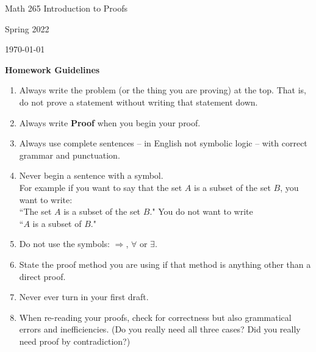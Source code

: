\documentclass[11pt]{report}
\theoremstyle{plain}
\begin{document}
\hfill Math 265 Introduction to Proofs

\hfill Spring 2022

\hfill \today

\begin{center}
\large{\textbf{Homework Guidelines}} \\
\end{center}
\begin{enumerate}
\item Always write the problem (or the thing you are proving) at the top. That is, do not prove a statement without writing that statement down.
\item Always write \textbf{Proof} when you begin your proof.
\item Always use complete sentences -- in English not symbolic logic -- with correct grammar and punctuation.
\item Never begin a sentence with a symbol.\\

For example if you want to say that the set $A$ is a subset of the set $B$, you want to write:\\ ``The set $A$ is a subset of the set $B.$" You do not want to write \\``$A$ is a subset of $B.$"

\item Do not use the symbols: $\Rightarrow$, $\forall$ or $\exists.$
\item State the proof method you are using if that method is anything other than a direct proof.
\item Never ever turn in your first draft. 
\item When re-reading your proofs, check for correctness but also grammatical errors and inefficiencies. (Do you really need all three cases? Did you really need proof by contradiction?)
\end{enumerate}
\end{document}
